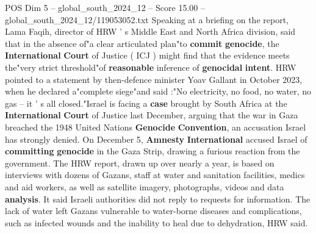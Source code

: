 \begin{textsample}{POS Dim 5 – global\_south\_2024\_12 – Score 15.00 – global\_south\_2024\_12/119053052.txt}
Speaking at a briefing on the report, Lama Faqih, director of HRW ' s Middle East and North Africa division, said that in the absence of"a clear articulated plan"to \textbf{commit} \textbf{genocide}, the \textbf{International} \textbf{Court} of Justice ( ICJ ) might find that the evidence meets the"very strict threshold"of \textbf{reasonable} inference of \textbf{genocidal} \textbf{intent}.
HRW pointed to a statement by then-defence minister Yoav Gallant in October 2023, when he declared a"complete siege"and said :"No electricity, no food, no water, no gas -- it ' s all closed."Israel is facing a \textbf{case} brought by South Africa at the \textbf{International} \textbf{Court} of Justice last December, arguing that the war in Gaza breached the 1948 United Nations \textbf{Genocide} \textbf{Convention}, an accusation Israel has strongly denied.
On December 5, \textbf{Amnesty} \textbf{International} accused Israel of \textbf{committing} \textbf{genocide} in the Gaza Strip, drawing a furious reaction from the government.
The HRW report, drawn up over nearly a year, is based on interviews with dozens of Gazans, staff at water and sanitation facilities, medics and aid workers, as well as satellite imagery, photographs, videos and data \textbf{analysis}.
It said Israeli authorities did not reply to requests for information.
The lack of water left Gazans vulnerable to water-borne diseases and complications, such as infected wounds and the inability to heal due to dehydration, HRW said.

\end{textsample}

